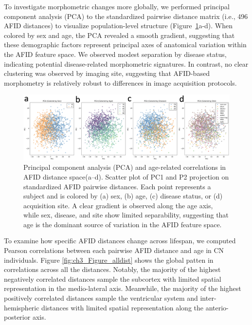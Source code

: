 To investigate morphometric changes more globally, we performed principal component analysis (PCA) to the standardized pairwise distance matrix (i.e., 496 AFID distances) to visualize population-level structure (Figure~\ref{fig:ch3_Figure_PCA}a-d). When colored by sex and age, the PCA revealed a smooth gradient, suggesting that these demographic factors represent principal axes of anatomical variation within the AFID feature space. We observed modest separation by disease status, indicating potential disease-related morphometric signatures. In contrast, no clear clustering was observed by imaging site, suggesting that AFID-based morphometry is relatively robust to differences in image acquisition protocols.
\begin{figure}[hbt!]
    \centering
    \includegraphics[width=1\linewidth]{figs/ch3_Figure_PCA.png}
    \caption{Principal component analysis (PCA) and age-related correlations in AFID distance space(a–d). Scatter plot of PC1 and P2 projection on standardized AFID pairwise distances. Each point represents a subject and is colored by (a) sex, (b) age, (c) disease status, or (d) acquisition site. A clear gradient is observed along the age axis, while sex, disease, and site show limited separability, suggesting that age is the dominant source of variation in the AFID feature space.}
    \label{fig:ch3_Figure_PCA}
\end{figure}


To examine how specific AFID distances change across lifespan, we computed Pearson correlations between each pairwise AFID distance and age in CN individuals. Figure \ref{fig:ch3_Figure_alldist} shows the global patten in correlations across all the distances. Notably, the majority of the highest negatively correlated distances sample the subcortex with limited spatial representation in the medio-lateral axis. Meanwhile, the majority of the highest positively correlated distances sample the ventricular system and inter-hemispheric distances with limited spatial representation along the anterio-posterior axis. 

